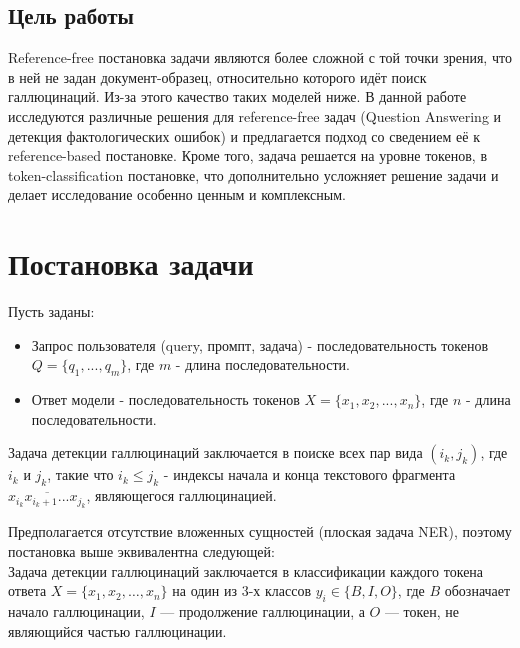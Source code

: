 \documentclass[12pt]{article}
\begin{document}
\subsection{Цель работы}
Reference-free постановка задачи являются более сложной с той точки зрения, что в ней не задан документ-образец, относительно которого идёт поиск галлюцинаций. Из-за этого качество таких моделей ниже. В данной работе исследуются различные решения для reference-free задач (Question Answering и детекция фактологических ошибок) и предлагается подход со сведением её к reference-based постановке. Кроме того, задача решается на уровне токенов, в token-classification постановке, что дополнительно усложняет решение задачи и делает исследование особенно ценным и комплексным.

 
\section{Постановка задачи}

Пусть заданы:
\begin{itemize}
    \item Запрос пользователя (query, промпт, задача) - последовательность токенов $Q = \{q_1,...,q_m\}$, где $m$ - длина последовательности.
    \item Ответ модели - последовательность токенов $X = \{x_1, x_2, . . . , x_n\}$, где $n$ - длина последовательности.
\end{itemize} 
Задача детекции галлюцинаций заключается в поиске всех пар вида $(i_k , j_k)$, где $i_k$ и $j_k$, такие что $i_k \leqslant j_k$ - индексы начала и конца текстового фрагмента $\overline{x_{i_k}x_{i_k+1}...x_{j_k}}$, являющегося галлюцинацией.

Предполагается отсутствие вложенных сущностей (плоская задача NER), поэтому постановка выше эквивалентна следующей: 
\\
Задача детекции галлюцинаций заключается в классификации каждого токена ответа \( X = \{x_1, x_2, \ldots, x_n\} \) на один из 3-х классов \( y_i \in \{B, I, O\} \), где \( B \) обозначает начало галлюцинации, \( I \) — продолжение галлюцинации, а \( O \) — токен, не являющийся частью галлюцинации.

%
%

\cite{baly2020we}
 
\end{document}
